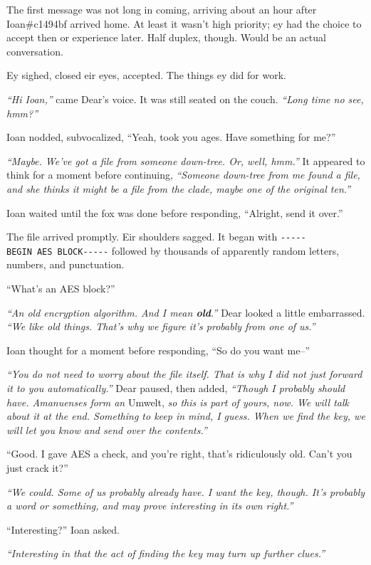 The first message was not long in coming, arriving about an hour after Ioan\#c1494bf arrived home. At least it wasn't high priority; ey had the choice to accept then or experience later. Half duplex, though. Would be an actual conversation.

Ey sighed, closed eir eyes, accepted. The things ey did for work.

\emph{``Hi Ioan,''} came Dear's voice. It was still seated on the couch. \emph{``Long time no see, hmm?''}

Ioan nodded, subvocalized, ``Yeah, took you ages. Have something for me?''

\emph{``Maybe. We've got a file from someone down-tree. Or, well, hmm.''} It appeared to think for a moment before continuing, \emph{``Someone down-tree from me found a file, and she thinks it might be a file from the clade, maybe one of the original ten.''}

Ioan waited until the fox was done before responding, ``Alright, send it over.''

The file arrived promptly. Eir shoulders sagged. It began with \texttt{-\/-\/-\/-\/-BEGIN\ AES\ BLOCK-\/-\/-\/-\/-} followed by thousands of apparently random letters, numbers, and punctuation.

``What's an AES block?''

\emph{``An old encryption algorithm. And I mean \textbf{old}.''} Dear looked a little embarrassed. \emph{``We like old things. That's why we figure it's probably from one of us.''}

Ioan thought for a moment before responding, ``So do you want me--''

\emph{``You do not need to worry about the file itself. That is why I did not just forward it to you automatically.''} Dear paused, then added, \emph{``Though I probably should have. Amanuenses form an} Umwelt, \emph{so this is part of yours, now. We will talk about it at the end. Something to keep in mind, I guess. When we find the key, we will let you know and send over the contents.''}

``Good. I gave AES a check, and you're right, that's ridiculously old. Can't you just crack it?''

\emph{``We could. Some of us probably already have. I want the key, though. It's probably a word or something, and may prove interesting in its own right.''}

``Interesting?'' Ioan asked.

\emph{``Interesting in that the act of finding the key may turn up further clues.''}

